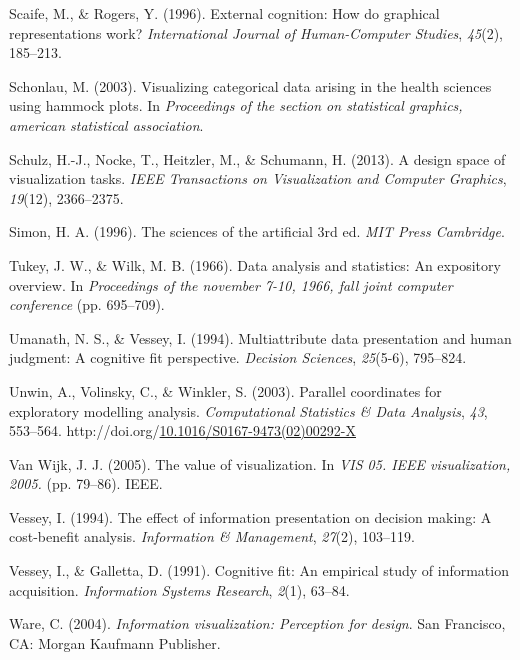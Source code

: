 \documentclass[print]{nuthesis}
\newlength{\cslhangindent}
\newenvironment{CSLReferences}[2]%
{\setlength{\parindent}{0pt}%
\everypar{\setlength{\hangindent}{\cslhangindent}}\ignorespaces}%
{\par}
\begin{document}
\begin{CSLReferences}{1}{0}
\leavevmode\hypertarget{ref-scaife1996}{}%
Scaife, M., \& Rogers, Y. (1996). External cognition: How do graphical representations work? \emph{International Journal of Human-Computer Studies}, \emph{45}(2), 185--213.

\leavevmode\hypertarget{ref-schonlau2003}{}%
Schonlau, M. (2003). Visualizing categorical data arising in the health sciences using hammock plots. In \emph{Proceedings of the section on statistical graphics, american statistical association}.

\leavevmode\hypertarget{ref-schulz2013}{}%
Schulz, H.-J., Nocke, T., Heitzler, M., \& Schumann, H. (2013). A design space of visualization tasks. \emph{IEEE Transactions on Visualization and Computer Graphics}, \emph{19}(12), 2366--2375.

\leavevmode\hypertarget{ref-simon1996}{}%
Simon, H. A. (1996). The sciences of the artificial 3rd ed. \emph{MIT Press Cambridge}.

\leavevmode\hypertarget{ref-tukey1966}{}%
Tukey, J. W., \& Wilk, M. B. (1966). Data analysis and statistics: An expository overview. In \emph{Proceedings of the november 7-10, 1966, fall joint computer conference} (pp. 695--709).

\leavevmode\hypertarget{ref-umanath1994}{}%
Umanath, N. S., \& Vessey, I. (1994). Multiattribute data presentation and human judgment: A cognitive fit perspective. \emph{Decision Sciences}, \emph{25}(5-6), 795--824.

\leavevmode\hypertarget{ref-unwin2003}{}%
Unwin, A., Volinsky, C., \& Winkler, S. (2003). Parallel coordinates for exploratory modelling analysis. \emph{Computational Statistics \& Data Analysis}, \emph{43}, 553--564. http://doi.org/\href{https://doi.org/10.1016/S0167-9473(02)00292-X}{10.1016/S0167-9473(02)00292-X}

\leavevmode\hypertarget{ref-van2005}{}%
Van Wijk, J. J. (2005). The value of visualization. In \emph{VIS 05. IEEE visualization, 2005.} (pp. 79--86). IEEE.

\leavevmode\hypertarget{ref-vessey1994}{}%
Vessey, I. (1994). The effect of information presentation on decision making: A cost-benefit analysis. \emph{Information \& Management}, \emph{27}(2), 103--119.

\leavevmode\hypertarget{ref-vessey1991}{}%
Vessey, I., \& Galletta, D. (1991). Cognitive fit: An empirical study of information acquisition. \emph{Information Systems Research}, \emph{2}(1), 63--84.

\leavevmode\hypertarget{ref-Ware2004}{}%
Ware, C. (2004). \emph{Information visualization: Perception for design}. San Francisco, CA: Morgan Kaufmann Publisher.


\end{CSLReferences}
\end{document}
